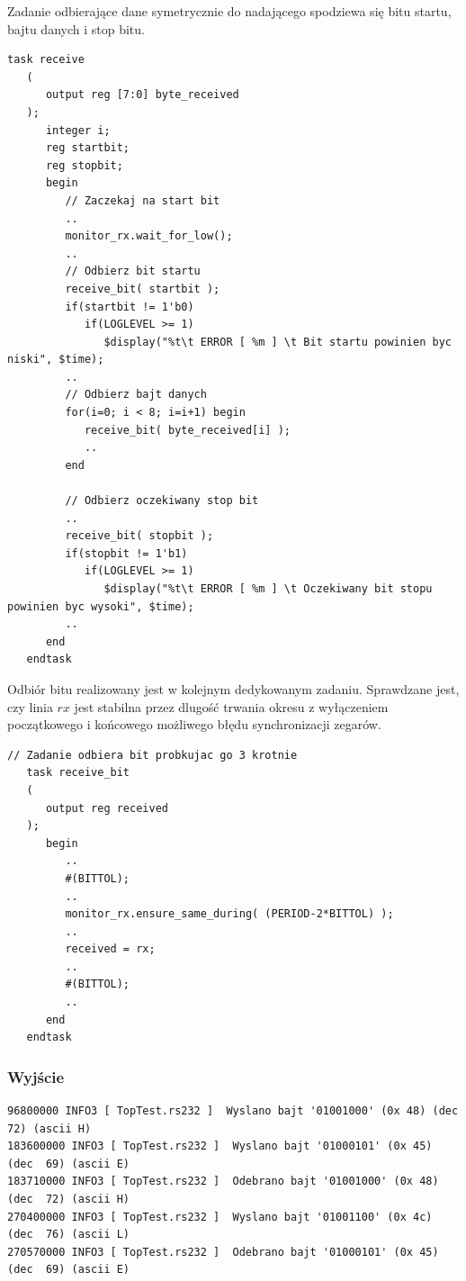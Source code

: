 \documentclass[a4paper,12pt]{article}
\begin{document}
Zadanie odbierające dane symetrycznie do nadającego spodziewa się bitu startu, bajtu danych i stop bitu.
\begin{lstlisting}[label=sim/Rs232 behav,caption=sim/Rs232 behav.v,firstnumber=118]
   task receive
   (
      output reg [7:0] byte_received
   );
      integer i;
      reg startbit;
      reg stopbit;
      begin
         // Zaczekaj na start bit
         ..
         monitor_rx.wait_for_low();
         ..
         // Odbierz bit startu
         receive_bit( startbit );
         if(startbit != 1'b0)
            if(LOGLEVEL >= 1)
               $display("%t\t ERROR [ %m ] \t Bit startu powinien byc niski", $time);
         ..
         // Odbierz bajt danych
         for(i=0; i < 8; i=i+1) begin
            receive_bit( byte_received[i] );
            ..
         end

         // Odbierz oczekiwany stop bit
         ..
         receive_bit( stopbit );
         if(stopbit != 1'b1)
            if(LOGLEVEL >= 1)
               $display("%t\t ERROR [ %m ] \t Oczekiwany bit stopu powinien byc wysoki", $time);
         ..
      end
   endtask
\end{lstlisting}

Odbiór bitu realizowany jest w kolejnym dedykowanym zadaniu. Sprawdzane jest, czy linia $rx$ jest stabilna przez dlugość trwania okresu z wyłączeniem początkowego i końcowego możliwego błędu synchronizacji zegarów.
\begin{lstlisting}[label=sim/Rs232 behav,caption=sim/Rs232 behav.v,firstnumber=89]
   // Zadanie odbiera bit probkujac go 3 krotnie
   task receive_bit
   (
      output reg received
   );
      begin
         ..
         #(BITTOL);
         ..
         monitor_rx.ensure_same_during( (PERIOD-2*BITTOL) );
         ..
         received = rx;
         ..
         #(BITTOL);
         ..
      end
   endtask
\end{lstlisting}


\subsubsection{Wyjście}

\begin{lstlisting}[label=rsout,caption=Rs log,firstnumber=255]
96800000 INFO3 [ TopTest.rs232 ]  Wyslano bajt '01001000' (0x 48) (dec  72) (ascii H)
183600000 INFO3 [ TopTest.rs232 ]  Wyslano bajt '01000101' (0x 45) (dec  69) (ascii E)
183710000 INFO3 [ TopTest.rs232 ]  Odebrano bajt '01001000' (0x 48) (dec  72) (ascii H)
270400000 INFO3 [ TopTest.rs232 ]  Wyslano bajt '01001100' (0x 4c) (dec  76) (ascii L)
270570000 INFO3 [ TopTest.rs232 ]  Odebrano bajt '01000101' (0x 45) (dec  69) (ascii E)
\end{lstlisting}
\end{document}
